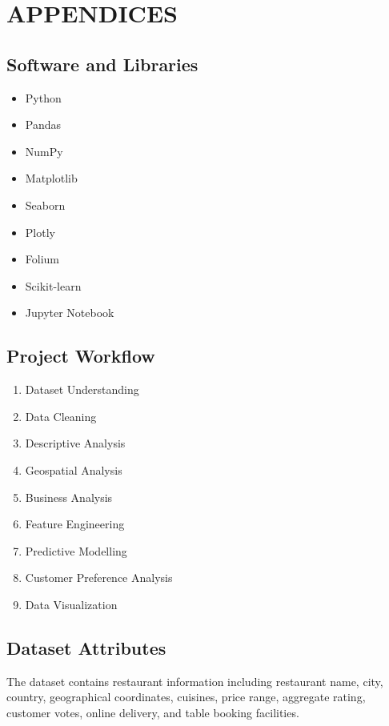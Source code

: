 \documentclass[12pt,a4paper]{report}
\begin{document}

\appendix

\chapter{APPENDICES}

\section{Software and Libraries}

\begin{itemize}
\item Python
\item Pandas
\item NumPy
\item Matplotlib
\item Seaborn
\item Plotly
\item Folium
\item Scikit-learn
\item Jupyter Notebook
\end{itemize}

\section{Project Workflow}

\begin{enumerate}
\item Dataset Understanding
\item Data Cleaning
\item Descriptive Analysis
\item Geospatial Analysis
\item Business Analysis
\item Feature Engineering
\item Predictive Modelling
\item Customer Preference Analysis
\item Data Visualization
\end{enumerate}

\section{Dataset Attributes}

The dataset contains restaurant information including restaurant name, city, country, geographical coordinates, cuisines, price range, aggregate rating, customer votes, online delivery, and table booking facilities.
\end{document}
